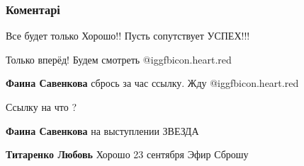  
 
 
 
 
\subsubsection{Коментарі}
\label{sec:19_09_2021.fb.savenkova_faina.1.teatr_sezon_otkrytie.cmt}

\begin{itemize} %
Все будет только Хорошо!! Пусть сопутствует УСПЕХ!!!

Только вперёд! Будем смотреть  @igg{fbicon.heart.red}

\textbf{Фаина Савенкова} сбрось за час ссылку. Жду @igg{fbicon.heart.red}

\begin{itemize} %
Ссылку на что ?

\textbf{Фаина Савенкова} на выступлении ЗВЕЗДА

\textbf{Титаренко Любовь} Хорошо 23 сентября Эфир Сброшу
\end{itemize} %

\end{itemize} %
